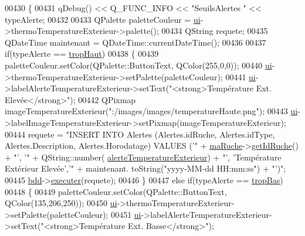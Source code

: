 \begin{DoxyCode}
00430 \{
00431     qDebug() << Q\_FUNC\_INFO << \textcolor{stringliteral}{"SeuilsAlertes "} << typeAlerte;
00432 
00433     QPalette paletteCouleur = \hyperlink{class_ruche_ihm_a64786058bd7f88ca2f1e9743bb27c25b}{ui}->thermoTemperatureExterieur->palette();
00434     QString requete;
00435     QDateTime maintenant = QDateTime::currentDateTime();
00436 
00437     \textcolor{keywordflow}{if}(typeAlerte == \hyperlink{parametres_8h_aaa6de8207c94675264c90b10b613368dabc650d9700ae19f2696e6a6e3f9ab067}{tropHaut})
00438      \{
00439         paletteCouleur.setColor(QPalette::ButtonText, QColor(255,0,0));
00440         \hyperlink{class_ruche_ihm_a64786058bd7f88ca2f1e9743bb27c25b}{ui}->thermoTemperatureExterieur->setPalette(paletteCouleur);
00441         \hyperlink{class_ruche_ihm_a64786058bd7f88ca2f1e9743bb27c25b}{ui}->labelAlerteTemperatureExterieur->setText(\textcolor{stringliteral}{"<strong>Température Ext. Elevée</strong>"});
00442         QPixmap imageTemperatureExterieur(\textcolor{stringliteral}{":/images/images/temperatureHaute.png"});
00443         \hyperlink{class_ruche_ihm_a64786058bd7f88ca2f1e9743bb27c25b}{ui}->labelImageTemperatureExterieur->setPixmap(imageTemperatureExterieur);
00444         requete = \textcolor{stringliteral}{"INSERT INTO Alertes (Alertes.idRuche, Alertes.idType, Alertes.Description,
       Alertes.Horodatage) VALUES ('"} + \hyperlink{class_ruche_ihm_a43a6b1fa31f4fba58d919daae3707b38}{maRuche}->\hyperlink{class_ruche_a9f2de5ef29557ec7a53d5e22df34d164}{getIdRuche}() + \textcolor{stringliteral}{"', '"} + QString::number(
      \hyperlink{parametres_8h_a83a725fd153179a2bd97afcc8307737ba300b33d38ff264e971908d263fbfd1bb}{alerteTemperatureExterieur}) + \textcolor{stringliteral}{"', 'Température Extérieur Elevée','"} + maintenant.
      toString(\textcolor{stringliteral}{"yyyy-MM-dd  HH:mm:ss"}) + \textcolor{stringliteral}{"')"};
00445         \hyperlink{class_ruche_ihm_a0851936fe212e8d40538264f09749153}{bdd}->\hyperlink{class_base_de_donnees_aa8de5f8f8bb17edc43f5c0ee33712081}{executer}(requete);
00446      \}
00447      \textcolor{keywordflow}{else} \textcolor{keywordflow}{if}(typeAlerte == \hyperlink{parametres_8h_aaa6de8207c94675264c90b10b613368da4257e2f8921856770c8266f55c937295}{tropBas})
00448      \{
00449         paletteCouleur.setColor(QPalette::ButtonText, QColor(135,206,250));
00450         \hyperlink{class_ruche_ihm_a64786058bd7f88ca2f1e9743bb27c25b}{ui}->thermoTemperatureExterieur->setPalette(paletteCouleur);
00451         \hyperlink{class_ruche_ihm_a64786058bd7f88ca2f1e9743bb27c25b}{ui}->labelAlerteTemperatureExterieur->setText(\textcolor{stringliteral}{"<strong>Température Ext. Basse</strong>"});

\end{DoxyCode}
